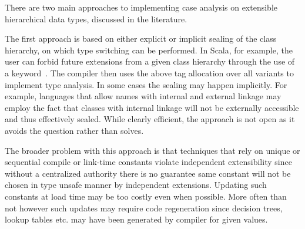 %

\noindent
There are two main approaches to implementing case analysis on extensible 
hierarchical data types, discussed in the literature.

The first approach is based on either explicit or implicit sealing of the class 
hierarchy, on which type switching can be performed. In Scala, for example, the 
user can forbid future extensions from a given class hierarchy through the use 
of a  keyword~\cite[.2]{EmirThesis}. The compiler 
then uses the above tag allocation over all variants to implement type analysis.
In some cases the sealing may happen implicitly. For example, languages that 
allow names with internal and external linkage may employ the fact that classes 
with internal linkage will not be externally accessible and thus effectively 
sealed. While clearly efficient, the approach is not open as it avoids the 
question rather than solves. 

The broader problem with this approach is that techniques that rely on unique or
sequential compile or link-time constants violate independent extensibility 
since without a centralized authority there is no guarantee same constant will 
not be chosen in type unsafe manner by independent extensions. Updating such 
constants at load time may be too costly even when possible. More often than 
not however such updates may require code regeneration since decision trees, 
lookup tables etc. may have been generated by compiler for given values.

